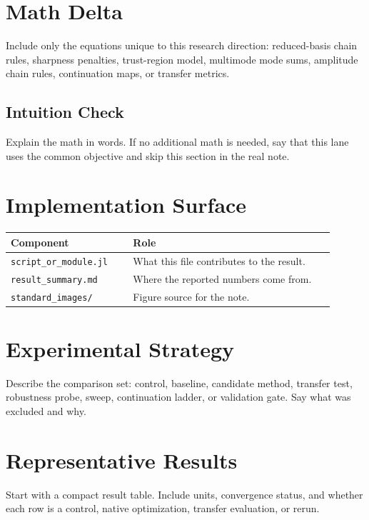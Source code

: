 \documentclass[11pt]{article}
\begin{document}
\section{Math Delta}

Include only the equations unique to this research direction: reduced-basis
chain rules, sharpness penalties, trust-region model, multimode mode sums,
amplitude chain rules, continuation maps, or transfer metrics.

\subsection*{Intuition Check}

Explain the math in words.  If no additional math is needed, say that this
lane uses the common objective and skip this section in the real note.

\section{Implementation Surface}

\begin{center}
\small
\begin{tabular}{p{0.34\linewidth}p{0.56\linewidth}}
\toprule
\textbf{Component} & \textbf{Role} \\
\midrule
\texttt{script\_or\_module.jl} & What this file contributes to the result. \\
\texttt{result\_summary.md} & Where the reported numbers come from. \\
\texttt{standard\_images/} & Figure source for the note. \\
\bottomrule
\end{tabular}
\end{center}

\section{Experimental Strategy}

Describe the comparison set: control, baseline, candidate method, transfer
test, robustness probe, sweep, continuation ladder, or validation gate.  Say
what was excluded and why.

\section{Representative Results}

Start with a compact result table.  Include units, convergence status, and
whether each row is a control, native optimization, transfer evaluation, or
rerun.
\end{document}
